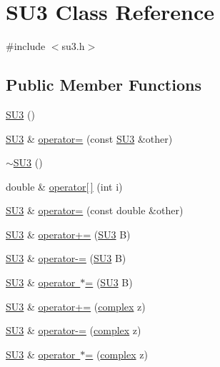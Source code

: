 \hypertarget{class_s_u3}{}\section{S\+U3 Class Reference}
\label{class_s_u3}


{\ttfamily \#include $<$su3.\+h$>$}

\subsection*{Public Member Functions}
\begin{DoxyCompactItemize}
\item 
\mbox{\hyperlink{class_s_u3_a79a4b45ff8cbe77f1f90a108971f822d}{S\+U3}} ()
\item 
\mbox{\hyperlink{class_s_u3}{S\+U3}} \& \mbox{\hyperlink{class_s_u3_a722bf7fb87348f75132cd1d25922d9f5}{operator=}} (const \mbox{\hyperlink{class_s_u3}{S\+U3}} \&other)
\item 
\mbox{\hyperlink{class_s_u3_af1e314363e80a0404023494937c56afa}{$\sim$\+S\+U3}} ()
\item 
double \& \mbox{\hyperlink{class_s_u3_a44d830566de4abc27eeea8dd338b0528}{operator\mbox{[}$\,$\mbox{]}}} (int i)
\item 
\mbox{\hyperlink{class_s_u3}{S\+U3}} \& \mbox{\hyperlink{class_s_u3_a16a4af3fc6b84d512c4a0ffd5aefaa87}{operator=}} (const double \&other)
\item 
\mbox{\hyperlink{class_s_u3}{S\+U3}} \& \mbox{\hyperlink{class_s_u3_aa22070a659e60ee2e252002106e375cb}{operator+=}} (\mbox{\hyperlink{class_s_u3}{S\+U3}} B)
\item 
\mbox{\hyperlink{class_s_u3}{S\+U3}} \& \mbox{\hyperlink{class_s_u3_a6edde88f3b6af05b8b5c3cc7415862b9}{operator-\/=}} (\mbox{\hyperlink{class_s_u3}{S\+U3}} B)
\item 
\mbox{\hyperlink{class_s_u3}{S\+U3}} \& \mbox{\hyperlink{class_s_u3_a499ee2a922f1568eee9fe2e04d8cbe89}{operator $\ast$=}} (\mbox{\hyperlink{class_s_u3}{S\+U3}} B)
\item 
\mbox{\hyperlink{class_s_u3}{S\+U3}} \& \mbox{\hyperlink{class_s_u3_a0dbe4da7ba00c8712e294984f9cbc0a8}{operator+=}} (\mbox{\hyperlink{classcomplex}{complex}} z)
\item 
\mbox{\hyperlink{class_s_u3}{S\+U3}} \& \mbox{\hyperlink{class_s_u3_ab86d0576a1029b0ae58fea437c4606aa}{operator-\/=}} (\mbox{\hyperlink{classcomplex}{complex}} z)
\item 
\mbox{\hyperlink{class_s_u3}{S\+U3}} \& \mbox{\hyperlink{class_s_u3_ad1b4ea5706f0d1764c7a9516255a74e4}{operator $\ast$=}} (\mbox{\hyperlink{classcomplex}{complex}} z)

\end{DoxyCompactItemize}
